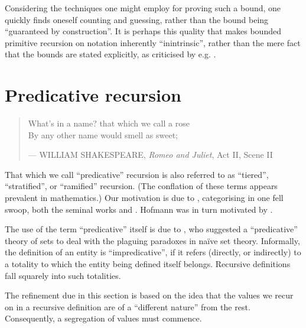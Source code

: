 Considering the techniques one might employ for proving such a bound, one
quickly finds oneself counting and guessing, rather than the bound being
``guaranteed by construction''.  It is perhaps this quality that makes bounded
primitive recursion on notation inherently ``inintrinsic'', rather than the
mere fact that the bounds are stated explicitly, as criticised by e.g.
\cite{hofmann-2000a}.

\section{Predicative recursion}

\begin{quotation}

\footnotesize\sffamily\itshape

\begin{flushright}

What's in a name? that which we call a rose \\
By any other name would smell as sweet;

\smallbreak

\upshape

--- WILLIAM SHAKESPEARE, \emph{Romeo and Juliet}, Act II, Scene II

\end{flushright}

\end{quotation}

That which we call ``predicative'' recursion is also referred to as
``tiered''\cite{leivant-1990}, ``stratified''\cite{leivant-1993}, or
``ramified''\cite{leivant-1995} recursion. (The conflation of these terms
appears prevalent in mathematics.) Our motivation is due to
\cite{hofmann-2000a}, categorising in one fell swoop, both the seminal works
\cite{bellantoni-cook-1992} and \cite{leivant-1995}. Hofmann was in turn
motivated by \cite{bellantoni-phd-1992}.

The use of the term ``predicative'' itself is due to \cite{russell-1907}, who
suggested a ``predicative'' theory of sets to deal with the plaguing paradoxes
in na\"ive set theory. Informally, the definition of an entity is
``impredicative''\cite{goedel-1944}, if it refers (directly, or indirectly) to
a totality to which the entity being defined itself belongs. Recursive
definitions fall squarely into such totalities. 

The refinement due in this section is based on the idea that the values we
recur on in a recursive definition are of a ``different nature'' from the
rest\cite{caseiro-1996}. Consequently, a segregation of values must commence.

